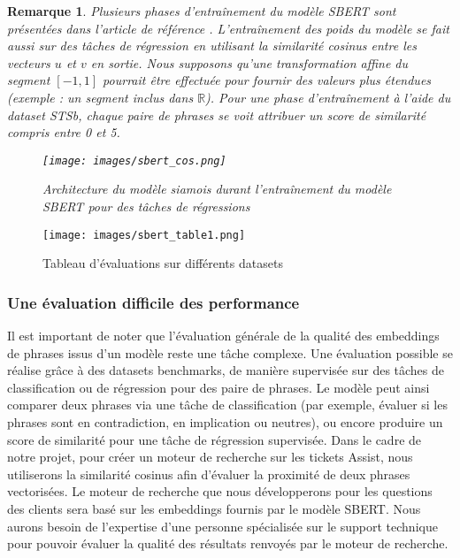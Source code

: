 \documentclass[12pt]{article}
\newtheorem{rmq}{Remarque}
\theoremstyle{definition}
\begin{document}
\newpage
\begin{rmq}
	Plusieurs phases d’entraînement du modèle SBERT sont présentées dans l’article de référence \cite{sbert}. L'entraînement des poids du modèle se fait aussi sur des tâches de régression en utilisant la similarité cosinus entre les vecteurs $u$ et $v$ en sortie. Nous supposons qu’une transformation affine du segment $[-1, 1]$ pourrait être effectuée pour fournir des valeurs plus étendues (exemple : un segment inclus dans $\mathbb{R}$). Pour une phase d’entraînement à l’aide du dataset STSb, chaque paire de phrases se voit attribuer un score de similarité compris entre 0 et 5.
	
	
	\begin{figure*}[!h]
		\centering
		\texttt{[image: images/sbert\_cos.png]}
		\caption{Architecture du modèle siamois durant l'entraînement du modèle SBERT pour des tâches de régressions \cite{sbert}}
	\end{figure*}
\end{rmq}


\begin{figure*}[!h]
	\centering
	\texttt{[image: images/sbert\_table1.png]}
	\caption{Tableau d'évaluations sur différents datasets}
\end{figure*}

\subsubsection{Une évaluation difficile des performance}
Il est important de noter que l'évaluation générale de la qualité des embeddings de phrases issus d'un modèle reste une tâche complexe. Une évaluation possible se réalise grâce à des datasets benchmarks, de manière supervisée sur des tâches de classification ou de régression pour des paire de phrases. Le modèle peut ainsi comparer deux phrases via une tâche de classification (par exemple, évaluer si les phrases sont en contradiction, en implication ou neutres), ou encore produire un score de similarité pour une tâche de régression supervisée. Dans le cadre de notre projet, pour créer un moteur de recherche sur les tickets Assist, nous utiliserons la similarité cosinus afin d'évaluer la proximité de deux phrases vectorisées. Le moteur de recherche que nous développerons pour les questions des clients sera basé sur les embeddings fournis par le modèle SBERT. Nous aurons besoin de l'expertise d'une personne spécialisée sur le support technique pour pouvoir évaluer la qualité des résultats renvoyés par le moteur de recherche.
\end{document}
